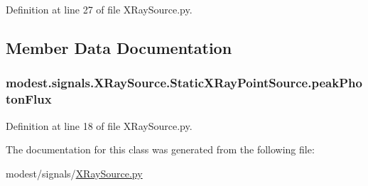 Definition at line 27 of file X\+Ray\+Source.\+py.



\subsection{Member Data Documentation}
\subsubsection[{\texorpdfstring{peak\+Photon\+Flux}{peakPhotonFlux}}]{\setlength{\rightskip}{0pt plus 5cm}modest.\+signals.\+X\+Ray\+Source.\+Static\+X\+Ray\+Point\+Source.\+peak\+Photon\+Flux}\hypertarget{classmodest_1_1signals_1_1XRaySource_1_1StaticXRayPointSource_a3d2fa8839fd1c39cfb115be825da90a8}{}\label{classmodest_1_1signals_1_1XRaySource_1_1StaticXRayPointSource_a3d2fa8839fd1c39cfb115be825da90a8}


Definition at line 18 of file X\+Ray\+Source.\+py.



The documentation for this class was generated from the following file\+:\begin{DoxyCompactItemize}
\item 
modest/signals/\hyperlink{XRaySource_8py}{X\+Ray\+Source.\+py}\end{DoxyCompactItemize}
